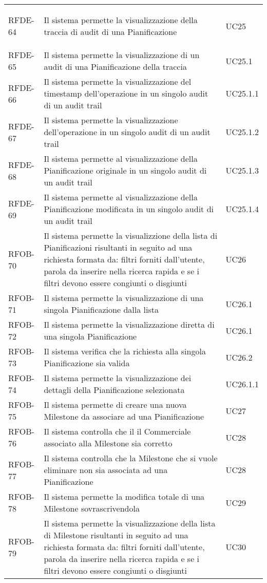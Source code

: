 \begin{center}
\begin{longtable}{p{2.0cm}|p{8cm}|p{2.7cm}}
\hypertarget{rf64}{RFDE-64} & Il sistema permette la visualizzazione della traccia di audit di una Pianificazione & UC25\\
RFDE-65 & Il sistema permette la visualizzazione di un audit di una Pianificazione della traccia & UC25.1\\
RFDE-66 & Il sistema permette la visualizzazione del timestamp dell'operazione in un singolo audit di un audit trail & UC25.1.1\\
RFDE-67 & Il sistema permette la visualizzazione dell'operazione in un singolo audit di un audit trail & UC25.1.2\\
RFDE-68 & Il sistema permette al visualizzazione della Pianificazione originale in un singolo audit di un audit trail & UC25.1.3\\
RFDE-69 & Il sistema permette al visualizzazione della Pianificazione modificata in un singolo audit di un audit trail & UC25.1.4\\
RFOB-70 & Il sistema permette la visualizzione della lista di Pianificazioni risultanti in seguito ad una richiesta formata da: filtri forniti dall'utente, parola da inserire nella ricerca rapida e se i filtri devono essere congiunti o disgiunti & UC26\\
RFOB-71 & Il sistema permette la visualizzazione di una singola Pianificazione dalla lista & UC26.1\\
RFOB-72 & Il sistema permette la visualizzazione diretta di una singola Pianificazione & UC26.1\\
RFOB-73 & Il sistema verifica che la richiesta alla singola Pianificazione sia valida & UC26.2\\
RFOB-74 & Il sistema permette la visualizzazione dei dettagli della Pianificazione selezionata & UC26.1.1\\
RFOB-75 & Il sistema permette di creare una nuova Milestone da associare ad una Pianificazione & UC27\\
RFOB-76 & Il sistema controlla che il il Commerciale associato alla Milestone sia corretto & UC28\\
RFOB-77 & Il sistema controlla che la Milestone che si vuole eliminare non sia associata ad una Pianificazione & UC28\\
RFOB-78 & Il sistema permette la modifica totale di una Milestone sovrascrivendola & UC29\\
RFOB-79 & Il sistema permette la visualizzazione della lista di Milestone risultanti in seguito ad una richiesta formata da: filtri forniti dall'utente, parola da inserire nella ricerca rapida e se i filtri devono essere congiunti o disgiunti & UC30\\

\end{longtable}
\end{center}
